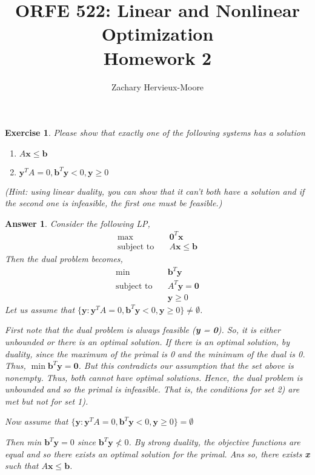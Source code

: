 \documentclass[12pt]{article}
\title{ORFE 522: Linear and Nonlinear Optimization \\ Homework 2}
\author{Zachary Hervieux-Moore}
\date{\displaydate{date}}
\theoremstyle{colon}
\newtheorem{exercise}{Exercise}
\newtheorem*{answer}{Answer}
\begin{document}
\maketitle

\clearpage

\begin{exercise}
  Please show that exactly one of the following systems has a solution
  \begin{enumerate}[label=\arabic*)]
    \item $A\textbf{x} \leq \textbf{b}$
    \item $\textbf{y}^T A = 0, \textbf{b}^T \textbf{y} < 0, \textbf{y} \geq 0$
  \end{enumerate}
  (Hint: using linear duality, you can show that it can't both have a solution and if the second one is infeasible, the first one must be feasible.)
\end{exercise}

\begin{answer}
  Consider the following LP,
  \begin{align*}
    \max \quad &\textbf{0}^T \textbf{x} \\
    \text{subject to} \quad &A\textbf{x} \leq \textbf{b}
  \end{align*}
  Then the dual problem becomes,
  \begin{align*}
    \min \quad &\textbf{b}^T \textbf{y} \\
    \text{subject to} \quad &A^T \textbf{y} = \textbf{0} \\
    &\textbf{y} \geq 0
  \end{align*}
  Let us assume that $\{{\textbf{y}: \textbf{y}^T A = 0, \textbf{b}^T \textbf{y} < 0, \textbf{y} \geq 0}\} \neq \emptyset$.

  First note that the dual problem is always feasible (\textbf{y} = \textbf{0}). So, it is either unbounded or there is an optimal solution. If there is an optimal solution, by duality, since the maximum of the primal is 0 and the minimum of the dual is 0. Thus, $\min \textbf{b}^T \textbf{y} = \textbf{0}$. But this contradicts our assumption that the set above is nonempty. Thus, both cannot have optimal solutions. Hence, the dual problem is unbounded and so the primal is infeasible. That is, the conditions for set 2) are met but not for set 1).

  Now assume that $\{{\textbf{y}: \textbf{y}^T A = 0, \textbf{b}^T \textbf{y} < 0, \textbf{y} \geq 0}\} = \emptyset$

  Then min $\textbf{b}^T \textbf{y} = 0$ since $\textbf{b}^T \textbf{y} \nless 0$. By strong duality, the objective functions are equal and so there exists an optimal solution for the primal. Ans so, there exists \textbf{x} such that $A\textbf{x} \leq \textbf{b}$.
\end{answer}
\end{document}
